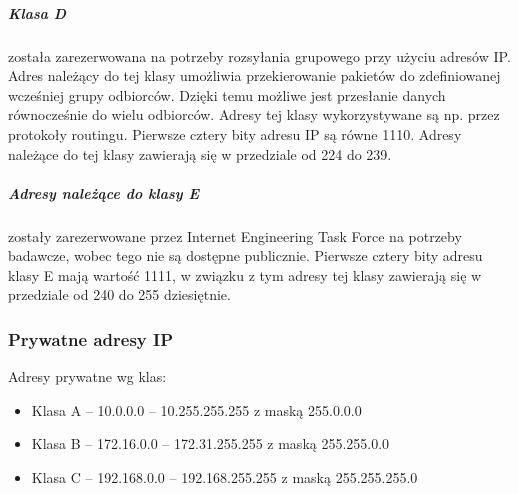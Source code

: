 \documentclass[a4paper,12pt,oneside]{book}
\begin{document}
			\subparagraph{Klasa D} została zarezerwowana na potrzeby rozsyłania grupowego przy użyciu adresów IP. Adres należący do tej klasy umożliwia przekierowanie pakietów do zdefiniowanej wcześniej grupy odbiorców. Dzięki temu możliwe jest przesłanie danych równocześnie do wielu odbiorców. Adresy tej klasy wykorzystywane są np. przez protokoły routingu. Pierwsze cztery bity adresu IP są równe 1110. Adresy należące do tej klasy zawierają się w przedziale od 224 do 239.
			
			\subparagraph{Adresy należące do klasy E} zostały zarezerwowane przez Internet Engineering Task Force na potrzeby badawcze, wobec tego nie są dostępne publicznie. Pierwsze cztery bity adresu klasy E mają wartość 1111, w związku z tym adresy tej klasy zawierają się w przedziale od 240 do 255 dziesiętnie.
			\subsubsection{Prywatne adresy IP}
				Adresy prywatne wg klas:
				\begin{itemize}
					\item Klasa A – 10.0.0.0 – 10.255.255.255 z maską 255.0.0.0
					\item Klasa B – 172.16.0.0 – 172.31.255.255 z maską 255.255.0.0
					\item Klasa C – 192.168.0.0 – 192.168.255.255 z maską 255.255.255.0
				\end{itemize}
\end{document}
